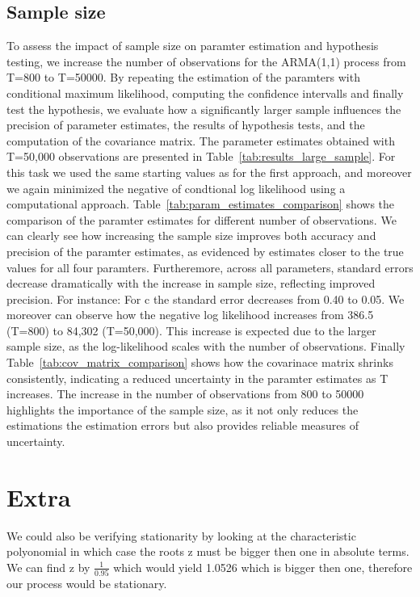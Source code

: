 \documentclass[a4paper,12pt]{article}
\begin{document}
\subsection{Sample size}
To assess the impact of sample size on paramter estimation and hypothesis testing, we increase the number of observations for the ARMA(1,1) process from T=800 to T=50000. By repeating the estimation of the paramters with conditional maximum likelihood, computing the confidence intervalls and finally test the hypothesis, we evaluate how a significantly larger sample influences the precision of parameter estimates, the results of hypothesis tests, and the computation of the covariance matrix.
The parameter estimates obtained with T=50,000 observations are presented in Table~\ref{tab:results_large_sample}.
For this task we used the same starting values as for the first approach, and moreover we again minimized the negative of condtional log likelihood using a computational approach. 
Table~\ref{tab:param_estimates_comparison} shows the comparison of the paramter estimates for different number of observations. We can clearly see how increasing the sample size improves both accuracy and precision of the paramter estimates, as evidenced by estimates closer to the true values for all four paramters. 
Furtheremore, across all parameters, standard errors decrease dramatically with the increase in sample size, reflecting improved precision. For instance: For c the standard error decreases from 0.40 to 0.05. 
We moreover can observe how the negative log likelihood increases from 386.5 (T=800) to 84,302 (T=50,000). This increase is expected due to the larger sample size, as the log-likelihood scales with the number of observations.
Finally Table~\ref{tab:cov_matrix_comparison} shows how the covarinace matrix shrinks consistently, indicating a reduced uncertainty in the paramter estimates as T increases. 
The increase in the number of observations from 800 to 50000 highlights the importance of the sample size, as it not only reduces the estimations the estimation errors but also provides reliable measures of uncertainty.








\section{Extra}
We could also be verifying stationarity by looking at the characteristic polyonomial in which case the roots z must be bigger then one in absolute terms. We can find z by $\frac{1}{0.95}$ which would yield 1.0526 which is bigger then one, therefore our process would be stationary.
\end{document}
